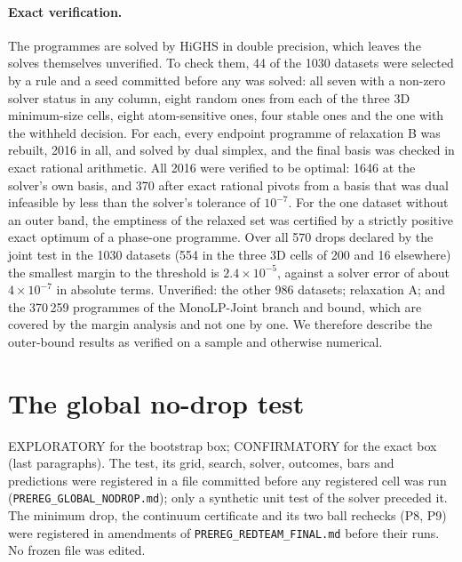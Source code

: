 \documentclass[aps,pre,twocolumn,superscriptaddress,nofootinbib,10pt]{revtex4-2}
\begin{document}
\paragraph*{Exact verification.}\label{sup:lp}
The programmes are solved by HiGHS in double precision, which leaves the solves themselves unverified. To check them, 44 of the 1030 datasets were selected by a rule and a seed committed before any was solved: all seven with a non-zero solver status in any column, eight random ones from each of the three 3D minimum-size cells, eight atom-sensitive ones, four stable ones and the one with the withheld decision. For each, every endpoint programme of relaxation B was rebuilt, 2016 in all, and solved by dual simplex, and the final basis was checked in exact rational arithmetic. All 2016 were verified to be optimal: 1646 at the solver's own basis, and 370 after exact rational pivots from a basis that was dual infeasible by less than the solver's tolerance of $10^{-7}$. For the one dataset without an outer band, the emptiness of the relaxed set was certified by a strictly positive exact optimum of a phase-one programme. Over all 570 drops declared by the joint test in the 1030 datasets (554 in the three 3D cells of 200 and 16 elsewhere) the smallest margin to the threshold is $2.4\times10^{-5}$, against a solver error of about $4\times10^{-7}$ in absolute terms. Unverified: the other 986 datasets; relaxation A; and the 370\,259 programmes of the \textsf{MonoLP-Joint} branch and bound, which are covered by the margin analysis and not one by one. We therefore describe the outer-bound results as verified on a sample and otherwise numerical.

\section{The global no-drop test}\label{sup:nodrop}
EXPLORATORY for the bootstrap box; CONFIRMATORY for the exact box (last paragraphs). The test, its grid, search, solver, outcomes, bars and predictions were registered in a file committed before any registered cell was run (\texttt{PREREG\_GLOBAL\_NODROP.md}); only a synthetic unit test of the solver preceded it. The minimum drop, the continuum certificate and its two ball rechecks (P8, P9) were registered in amendments of \texttt{PREREG\_REDTEAM\_FINAL.md} before their runs. No frozen file was edited.
\end{document}
